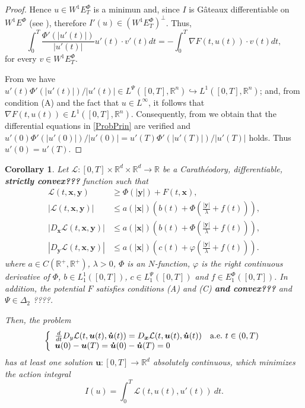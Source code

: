 \documentclass[twoside]{article}
\newtheorem{cor}[thm]{Corollary}
\theoremstyle{remark}
\newcommand{\lpsi}{L^{\Psi}}
\newcommand{\ephi}{E^{\Phi}}
\newcommand{\wphiet}{W^{1}\ephi_T}
\newcommand{\wphie}{W^{1}\ephi}
\renewcommand{\b}[1]{\boldsymbol{#1}}
\newcommand{\rr}{\mathbb{R}}
\renewcommand{\leq}{\leqslant}
\renewcommand{\geq}{\geqslant}
\begin{document}
\begin{proof}
Hence $u\in \wphiet$ is a minimun and, since $I$ is G\^ateaux differentiable on $\wphie$ (see  \cite[Thm. 3.2]{ABGMS2015}), 
therefore $I'(u)\in (\wphiet)^{\perp}$. Thus,
\[\int_0^T \frac{\Phi'(|u'(t)|)}{|u'(t)|}u'(t)\cdot v'(t)dt =-\int_0^T \nabla F(t,u(t))\cdot v(t)dt,\]
for every  $v\in \wphiet$.  



From \cite[Lemma 2.4]{ABGMS2015} we have 
 $u'(t)\Phi'(|u'(t)|)/|u'(t)|\in \lpsi([0,T],\rr^n)\hookrightarrow L^1([0,T],\rr^n)$; 
and,  from condition (A) and the fact that $u\in L^{\infty}$, it follows that $\nabla F(t,u(t))\in L^1([0,T],\rr^n)$. 
Consequently, from \cite[p. 6]{mawhin2010critical} we obtain that the differential equations in \eqref{ProbPrin} 
are verified and $u'(0)\Phi'(|u'(0)|)/|u'(0)|=u'(T)\Phi'(|u'(T)|)/|u'(T)|$ holds. Thus $u'(0)=u'(T)$.
\end{proof}

\begin{cor}
Let 
$\mathcal{L}:[0,T]\times\rr^d\times\rr^d\to\rr$ 
be a Carath\'eodory, differentiable, {\bf strictly convex???} function such that 
\begin{eqnarray}
\mathcal{L}(t,\b{x},\b{y}) &\geq \Phi\left(|\b{y}|\right)+ F(t,\b{x}),\label{cota_inf_2}\\
|\mathcal{L}(t,\b{x},\b{y})| &\leq a(|\b{x}|)\left(b(t)+ \Phi\left(\frac{|\b{y}|}{\lambda}+f(t) \right)\right),\label{cotaL}\\
|D_{\b{x}}\mathcal{L}(t,\b{x},\b{y})| &\leq a(|\b{x}|)\left(b(t)+ \Phi\left(\frac{|\b{y}|}{\lambda}+f(t) \right)\right),\label{cotaDxL}\\
|D_{\b{y}}\mathcal{L}(t,\b{x},\b{y})| &\leq a(|\b{x}|)\left(c(t)+ \varphi\left(\frac{|\b{y}|}{\lambda}+f(t)\right)  \right).\label{cotaDyL}
\end{eqnarray}
where $a\in C(\mathbb{R}^+,\mathbb{R}^+)$, $\lambda>0$, $\Phi$ is an $N$-function, 
$\varphi$ is the right continuous derivative of $\Phi$,  
$b\in L^1_1([0,T]) $,  $c\in\lpsi_1([0,T])$ and  $f\in \ephi_1([0,T])$.
In addition, the potential $F$ satisfies conditions (A) and (C) {\bf and convex???} and $\Psi \in \Delta_2$ ????.

Then, the problem
\begin{equation}\label{ProbPrin-gral}
    \left\{%
\begin{array}{ll}
   \frac{d}{dt} D_{y}\mathcal{L}(t,\b{u}(t),\b{\dot{u}}(t))= D_{\b{x}}\mathcal{L}(t,\b{u}(t),\b{\dot{u}}(t)) \quad \hbox{a.e.}\ t \in (0,T)\\
    \b{u}(0)-\b{u}(T)=\b{\dot{u}}(0)-\b{\dot{u}}(T)=0
\end{array}%
\right.
\end{equation}
has at least one solution $\b{u}:[0,T]\to\rr^d$ absolutely continuous, 
which minimizes the action integral
\begin{equation}\label{integral_accion}
I(u)=\int_{0}^T \mathcal{L}(t,u(t),u'(t))\ dt.
\end{equation}
\end{cor}
\end{document}
